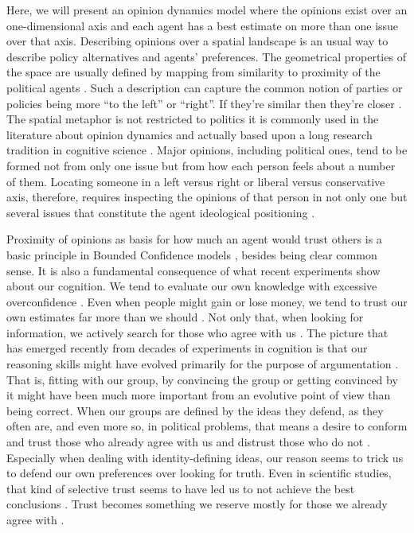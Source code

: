 \documentclass{article}
\begin{document}
Here, we will present an opinion dynamics model \cite{castellanoetal07,
  galam12a, galametal82, galammoscovici91, sznajd00, deffuantetal00, martins08a}
where the opinions exist over an one-dimensional axis and each agent has a best
estimate on more than one issue over that axis. Describing opinions over a
spatial landscape is an usual way to describe policy alternatives and agents'
preferences. The geometrical properties of the space are usually defined by
mapping from similarity to proximity of the political agents
\cite{downs1957economic, laver2014measuring, tomz2008candidate}. Such a
description can capture the common notion of parties or policies being more ``to
the left'' or ``right''. If they're similar then they're closer
\cite{van2005political, miller2015spatial}. The spatial metaphor is not
restricted to politics it is commonly used in the literature about opinion
dynamics and actually based upon a long research tradition in cognitive science
\cite{aisbett2001general, attneave1950dimensions,gardenfors2004conceptual}.
Major opinions, including political ones, tend to be formed not from only one
issue but from how each person feels about a number of them. Locating someone in
a left versus right or liberal versus conservative axis, therefore, requires
inspecting the opinions of that person in not only one but several issues that
constitute the agent ideological positioning \cite{benoit2006party}.

Proximity of opinions as basis for how much an agent would trust others is a basic principle in Bounded Confidence models \cite{deffuantetal00,hegselmannkrause02,amblarddeffuant04,franksetal08}, besides being clear common sense. It is also a fundamental consequence of what recent experiments show about our cognition. We tend to evaluate our own knowledge with excessive overconfidence \cite{oskamp65a,tsaietal08a}. Even when people might gain or lose money, we tend to trust our own estimates far more than we should \cite{albahutchinson00a,praetoriusetal13a,chaplinshaw15a}. Not only that, when looking for information, we actively search for those who agree with us \cite{nickerson98a}. The picture that has emerged recently from decades of experiments in cognition is that our reasoning skills might have evolved primarily for the purpose of argumentation \cite{mercier11a,merciersperber11a}. That is, fitting with our group, by convincing the group or getting convinced by it might have been much more important from an evolutive point of view than being correct. When our groups are defined by the ideas they defend, as they often are, and even more so, in political problems, that means a desire to conform and trust those who already agree with us and distrust those who do not \cite{martins16a}. Especially when dealing with identity-defining ideas, our reason seems to trick us to defend our own preferences \cite{kahan10a,kahanetal12a} over looking for truth. Even in scientific studies, that kind of selective trust seems to have led us to not achieve the best conclusions \cite{Martins2016,Martins2017}. Trust becomes something we reserve mostly for those we already agree with \cite{Mercier2017}.
\end{document}
